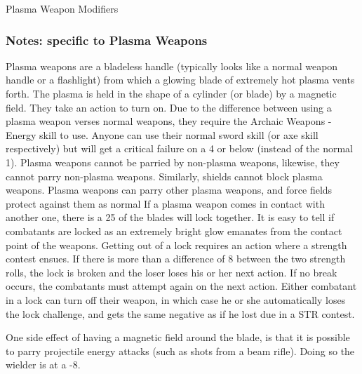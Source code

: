 \documentclass[twoside]{book}
\begin{document}
                
              Plasma Weapon Modifiers  
            
\subsubsection{Notes: specific to Plasma Weapons}
      
                   Plasma weapons are a bladeless handle (typically
                   looks like a normal weapon handle or a flashlight)
                   from which a glowing blade of extremely hot plasma
                   vents forth. The plasma is held in the shape of a
                   cylinder (or blade) by a magnetic field. They take an
                   action to turn on. 
                   Due to the difference between using a plasma
                   weapon verses normal weapons, they require the Archaic
                   Weapons - Energy skill to use. Anyone can use their
                   normal sword skill (or axe skill respectively) but
                   will get a critical failure on a 4 or below (instead
                   of the normal 1). 
                   Plasma weapons cannot be parried by non-plasma
                   weapons, likewise, they cannot parry non-plasma
                   weapons. Similarly, shields cannot block plasma
                   weapons. Plasma weapons can parry other plasma
                   weapons, and force fields protect against them as
                   normal If a plasma weapon comes in contact with
                   another one, there is a 25%
                   of the blades will lock together. It is easy to tell
                   if combatants are locked as an extremely bright glow
                   emanates from the contact point of the weapons.
                   Getting out of a lock requires an action where a
                   strength contest ensues. If there is more than a
                   difference of 8 between the two strength rolls, the
                   lock is broken and the loser loses his or her next
                   action. If no break occurs, the combatants must
                   attempt again on the next action. Either combatant in
                   a lock can turn off their weapon, in which case he or
                   she automatically loses the lock challenge, and gets
                   the same negative as if he lost due in a STR contest.
                   
                   One side effect of having a magnetic field
                   around the blade, is that it is possible to parry
                   projectile energy attacks (such as shots from a beam
                   rifle). Doing so the wielder is at a -8. 
              
\end{document}
